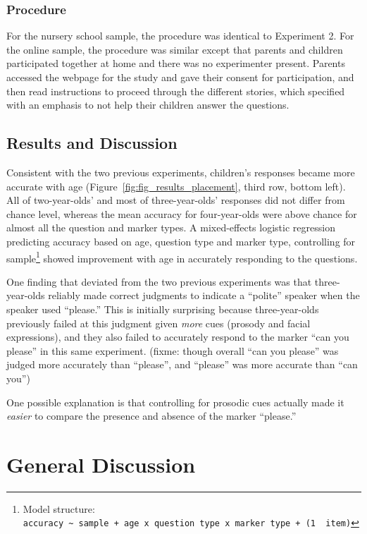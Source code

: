 \documentclass[10pt, letterpaper]{article}
\begin{document}
\subsubsection{Procedure}\label{procedure-2}

For the nursery school sample, the procedure was identical to Experiment
2. For the online sample, the procedure was similar except that parents
and children participated together at home and there was no experimenter
present. Parents accessed the webpage for the study and gave their
consent for participation, and then read instructions to proceed through
the different stories, which specified with an emphasis to not help
their children answer the questions.

\subsection{Results and Discussion}\label{results-and-discussion-2}

Consistent with the two previous experiments, children's responses
became more accurate with age (Figure~\ref{fig:fig_results_placement},
third row, bottom left). All of two-year-olds' and most of
three-year-olds' responses did not differ from chance level, whereas the
mean accuracy for four-year-olds were above chance for almost all the
question and marker types. A mixed-effects logistic regression
predicting accuracy based on age, question type and marker type,
controlling for sample\footnote{Model structure:
  \texttt{accuracy\ \textasciitilde{}\ sample\ +\ age\ x\ question\ type\ x\ marker\ type\ +\ (1\ \textbar{}\ item)}}
showed improvement with age in accurately responding to the questions.

One finding that deviated from the two previous experiments was that
three-year-olds reliably made correct judgments to indicate a ``polite''
speaker when the speaker used ``please.'' This is initially surprising
because three-year-olds previously failed at this judgment given
\emph{more} cues (prosody and facial expressions), and they also failed
to accurately respond to the marker ``can you please'' in this same
experiment. (fixme: though overall ``can you please'' was judged more
accurately than ``please'', and ``please'' was more accurate than ``can
you'')

One possible explanation is that controlling for prosodic cues actually
made it \emph{easier} to compare the presence and absence of the marker
``please.''

\section{General Discussion}\label{general-discussion}
\end{document}

